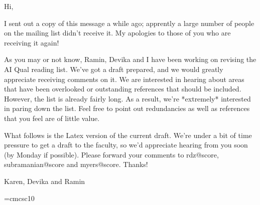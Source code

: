 Hi,

	I sent out a copy of this message a while ago;  apprently a
large number of people on the mailing list didn't receive it.  My
apologies to those of you who are receiving it again!

	As you may or not know, Ramin, Devika and I have been working
on revising the AI Qual reading list.  We've got a draft prepared, and
we would greatly appreciate receiving comments on it. We are
interested in hearing about areas that have been overlooked or
outstanding references that should be included.  However,  the list is
already fairly long.  As a result,  we're *extremely* interested in
paring down the list.  Feel free to point out redundancies as well as
references that you feel are of little value.

	What follows is the Latex version of the current draft.  We're
under a bit of time pressure to get a draft to the faculty, so we'd
appreciate hearing from you soon (by Monday if possible).  Please
forward your comments to rdz@score, subramanian@score and myers@score.  Thanks!

Karen, Devika and Ramin

\font\sc=cmcsc10
\setlength{\textwidth}{6in}                                
\setlength{\textheight}{8in}                               
\setlength{\topmargin}{0pt}                          
\setlength{\oddsidemargin}{0pt}                          
\setlength{\parskip}{\smallskipamount}
\setlength{\evensidemargin}{0pt}                         
\setlength{\headheight}{0pt}                             
\setlength{\headsep}{0pt}    
\def\today{\ifcase\month\or
  January\or February\or March\or April\or May\or June\or
  July\or August\or September\or October\or November\or December\fi
  \space\number\day, \number\year}

\newenvironment{required}%
{\begin{itemize}\renewcommand{\labelitemi}{$\bullet$}}%
{\end{itemize}}

\newcommand{\paper}{\item}

\newenvironment{optional}%
{\begin{itemize}\renewcommand{\labelitemi}{$\circ$}}%
{\end{itemize}}



